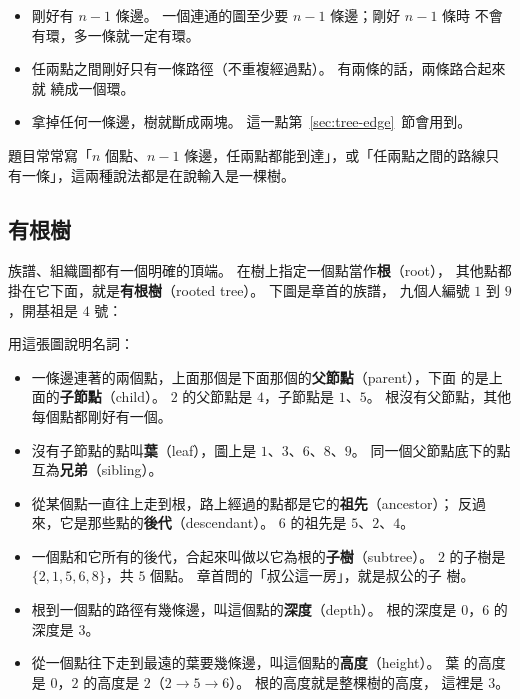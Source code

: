 \begin{itemize}
\item 剛好有 $n - 1$ 條邊。 一個連通的圖至少要 $n - 1$ 條邊；剛好 $n - 1$ 條時
不會有環，多一條就一定有環。
\item 任兩點之間剛好只有一條路徑（不重複經過點）。 有兩條的話，兩條路合起來就
繞成一個環。
\item 拿掉任何一條邊，樹就斷成兩塊。 這一點第~\ref{sec:tree-edge}~節會用到。
\end{itemize}

題目常常寫「$n$ 個點、$n - 1$ 條邊，任兩點都能到達」，或「任兩點之間的路線只
有一條」，這兩種說法都是在說輸入是一棵樹。

\subsection{有根樹}

族譜、組織圖都有一個明確的頂端。 在樹上指定一個點當作\textbf{根}（root），
其他點都掛在它下面，就是\textbf{有根樹}（rooted tree）。 下圖是章首的族譜，
九個人編號 $1$ 到 $9$，開基祖是 $4$ 號：

\begin{center}
\label{fig:tree-family}
\end{center}

用這張圖說明名詞：

\begin{itemize}
\item 一條邊連著的兩個點，上面那個是下面那個的\textbf{父節點}（parent），下面
的是上面的\textbf{子節點}（child）。 $2$ 的父節點是 $4$，子節點是 $1$、$5$。
根沒有父節點，其他每個點都剛好有一個。
\item 沒有子節點的點叫\textbf{葉}（leaf），圖上是 $1$、$3$、$6$、$8$、$9$。
同一個父節點底下的點互為\textbf{兄弟}（sibling）。
\item 從某個點一直往上走到根，路上經過的點都是它的\textbf{祖先}（ancestor）；
反過來，它是那些點的\textbf{後代}（descendant）。 $6$ 的祖先是 $5$、$2$、$4$。
\item 一個點和它所有的後代，合起來叫做以它為根的\textbf{子樹}（subtree）。 $2$
的子樹是 $\{2, 1, 5, 6, 8\}$，共 $5$ 個點。 章首問的「叔公這一房」，就是叔公的子
樹。
\item 根到一個點的路徑有幾條邊，叫這個點的\textbf{深度}（depth）。 根的深度是
$0$，$6$ 的深度是 $3$。
\item 從一個點往下走到最遠的葉要幾條邊，叫這個點的\textbf{高度}（height）。 葉
的高度是 $0$，$2$ 的高度是 $2$（$2 \to 5 \to 6$）。 根的高度就是整棵樹的高度，
這裡是 $3$。
\end{itemize}

